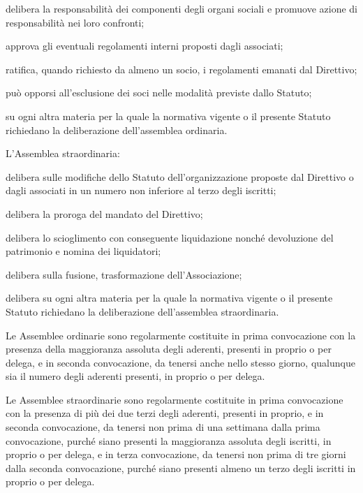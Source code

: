 \documentclass[legalpaper, 11pt]{exam}
\let\tempone\enumerate
\let\temptwo\endenumerate
\renewenvironment{enumerate}{\tempone\addtolength{\itemsep}{-0.45\baselineskip}}{\temptwo}
\begin{document}
{\begin{enumerate}
\begin{enumerate}
  \item delibera la responsabilità dei componenti degli organi sociali e promuove azione di responsabilità nei loro confronti;
  \item approva gli eventuali regolamenti interni proposti dagli associati;
  \item ratifica, quando richiesto da almeno un socio, i regolamenti emanati dal Direttivo;
  \item può opporsi all’esclusione dei soci nelle modalità previste dallo Statuto;
  \item su ogni altra materia per la quale la normativa vigente o il presente Statuto richiedano la deliberazione dell'assemblea ordinaria.
 \end{enumerate}
 \item L'Assemblea straordinaria:
 \vspace{-5pt}
 \begin{enumerate}
  \item delibera sulle modifiche dello Statuto dell’organizzazione proposte dal Direttivo o dagli associati in un numero non inferiore al terzo degli iscritti;
  \item delibera la proroga del mandato del Direttivo;
  \item delibera lo scioglimento con conseguente liquidazione nonché devoluzione del patrimonio e nomina dei liquidatori;
  \item delibera sulla fusione, trasformazione dell’Associazione;
  \item delibera su ogni altra materia per la quale la normativa vigente o il presente Statuto richiedano la deliberazione dell'assemblea straordinaria.
 \end{enumerate}
 \item Le Assemblee ordinarie sono regolarmente costituite in prima convocazione con la presenza della maggioranza assoluta degli aderenti, presenti in proprio o per delega, e in seconda convocazione, da tenersi anche nello stesso giorno, qualunque sia il numero degli aderenti presenti, in proprio o per delega.
 \item Le Assemblee straordinarie sono regolarmente costituite in prima convocazione con la presenza di più dei due terzi degli aderenti, presenti in proprio, e in seconda convocazione, da tenersi non prima di una settimana dalla prima convocazione, purché siano presenti la maggioranza assoluta degli iscritti, in proprio o per delega, e in terza convocazione, da tenersi non prima di tre giorni dalla seconda convocazione, purché siano presenti almeno un terzo degli iscritti in proprio o per delega.

\end{enumerate}}
\end{document}
